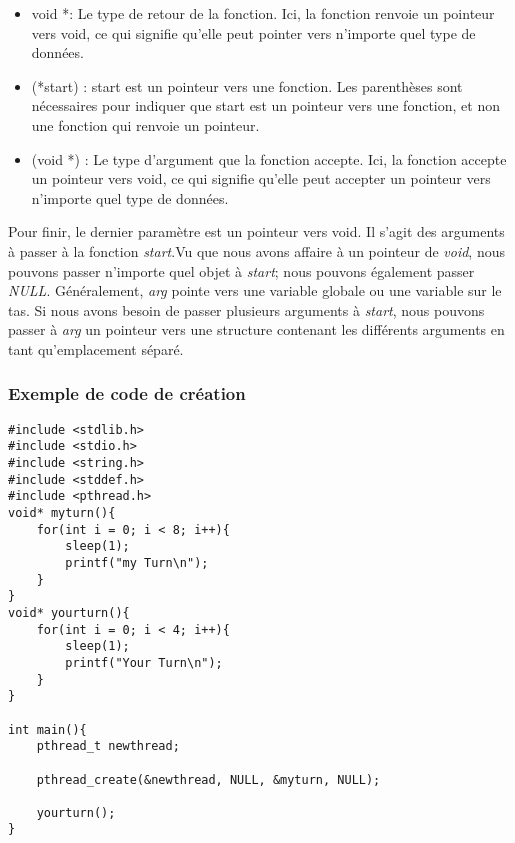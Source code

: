 \begin{itemize}
    \item 	void *: Le type de retour de la fonction. Ici, la fonction renvoie un pointeur vers void, ce qui signifie qu’elle peut pointer vers n’importe quel type de données.
    \\
    \item 	(*start) : start est un pointeur vers une fonction. Les parenthèses sont nécessaires pour indiquer que start est un pointeur vers une fonction, et non une fonction qui renvoie un pointeur.
    \\
    \item 	(void *) : Le type d’argument que la fonction accepte. Ici, la fonction accepte un pointeur vers void, ce qui signifie qu’elle peut accepter un pointeur vers n’importe quel type de données.
    \\   
\end{itemize}
\vspace{\baselineskip}

Pour finir, le dernier paramètre est un pointeur vers void. Il s'agit des arguments à passer à la fonction \textit{start}.Vu que nous avons affaire à un pointeur de \textit{void}, nous pouvons passer n'importe quel objet à \textit{start}; nous pouvons également passer \textit{NULL}. Généralement, \textit{arg} pointe vers une variable globale ou une variable sur le tas. Si nous avons besoin de passer plusieurs arguments à \textit{start}, nous pouvons passer à \textit{arg} un pointeur vers une structure contenant les différents arguments en tant qu'emplacement séparé.
\\

\subsubsection{Exemple de code de création}
\begin{lstlisting}[title = Exemple de code de création ]
#include <stdlib.h>
#include <stdio.h>
#include <string.h>
#include <stddef.h>
#include <pthread.h>
void* myturn(){
	for(int i = 0; i < 8; i++){
		sleep(1);
		printf("my Turn\n");
	}
}
void* yourturn(){
	for(int i = 0; i < 4; i++){
		sleep(1);
		printf("Your Turn\n");
	}
}

int main(){
	pthread_t newthread;

	pthread_create(&newthread, NULL, &myturn, NULL);
	
	yourturn();
}
\end{lstlisting}
\vspace{\baselineskip}


